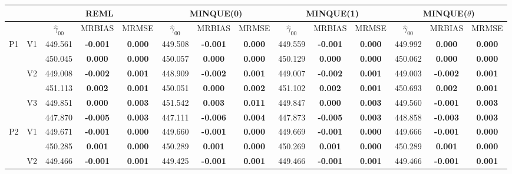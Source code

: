 \documentclass[12pt,a4paper]{article}
\begin{document}
\begin{sidewaystable}[H]
\centering
{\footnotesize
\begin{tabular}{cc|ccc|ccc|ccc|ccc|}
   & & \multicolumn{3}{c|}{REML}&\multicolumn{3}{c|}{MINQUE(0)}&\multicolumn{3}{c|}{MINQUE(1)}&\multicolumn{3}{c|}{MINQUE($\theta$)}\\ \hline
 &  & $\hat{\gamma}_{00}$ & MRBIAS & MRMSE & $\hat{\gamma}_{00}$ & MRBIAS & MRMSE & $\hat{\gamma}_{00}$ & MRBIAS & MRMSE & $\hat{\gamma}_{00}$ & MRBIAS & MRMSE \\ 
  \hline
\multirow{6}{*}{P1} & \multirow{2}{*}{V1} & 449.561 & \textbf{-0.001} & \textbf{0.000} & 449.508 & \textbf{-0.001} & \textbf{0.000} & 449.559 & \textbf{-0.001} & \textbf{0.000} & 449.992 & \textbf{0.000} & \textbf{0.000} \\ 
   &  & 450.045 & \textbf{0.000} & \textbf{0.000} & 450.057 & \textbf{0.000} & \textbf{0.000} & 450.129 & \textbf{0.000} & \textbf{0.000} & 450.062 & \textbf{0.000} & \textbf{0.000} \\ 
   & \multirow{2}{*}{V2} & 449.008 & \textbf{-0.002} & \textbf{0.001} & 448.909 & \textbf{-0.002} & \textbf{0.001} & 449.007 & \textbf{-0.002} & \textbf{0.001} & 449.003 & \textbf{-0.002} & \textbf{0.001} \\ 
   &  & 451.113 & \textbf{0.002} & \textbf{0.001} & 450.051 & \textbf{0.000} & \textbf{0.002} & 451.102 & \textbf{0.002} & \textbf{0.001} & 450.693 & \textbf{0.002} & \textbf{0.001} \\ 
   & \multirow{2}{*}{V3} & 449.851 & \textbf{0.000} & \textbf{0.003} & 451.542 & \textbf{0.003} & \textbf{0.011} & 449.847 & \textbf{0.000} & \textbf{0.003} & 449.560 & \textbf{-0.001} & \textbf{0.003} \\ 
   &  & 447.870 & \textbf{-0.005} & \textbf{0.003} & 447.111 & \textbf{-0.006} & \textbf{0.004} & 447.873 & \textbf{-0.005} & \textbf{0.003} & 448.858 & \textbf{-0.003} & \textbf{0.003} \\ 
   \hline \hline\multirow{6}{*}{P2} & \multirow{2}{*}{V1} & 449.671 & \textbf{-0.001} & \textbf{0.000} & 449.660 & \textbf{-0.001} & \textbf{0.000} & 449.669 & \textbf{-0.001} & \textbf{0.000} & 449.666 & \textbf{-0.001} & \textbf{0.000} \\ 
   &  & 450.285 & \textbf{0.001} & \textbf{0.000} & 450.289 & \textbf{0.001} & \textbf{0.000} & 450.269 & \textbf{0.001} & \textbf{0.000} & 450.289 & \textbf{0.001} & \textbf{0.000} \\ 
   & \multirow{2}{*}{V2} & 449.466 & \textbf{-0.001} & \textbf{0.001} & 449.425 & \textbf{-0.001} & \textbf{0.001} & 449.466 & \textbf{-0.001} & \textbf{0.001} & 449.466 & \textbf{-0.001} & \textbf{0.001} \\ 

\end{tabular}}
\end{sidewaystable}
\end{document}
